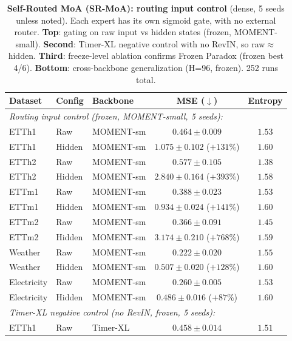 \documentclass{article}
\begin{document}
\begin{table}[!htbp]
\centering
\caption{\textbf{Self-Routed MoA (SR-MoA): routing input control} (dense, 5 seeds unless noted). Each expert has its own sigmoid gate, with no external router. \textbf{Top}: gating on raw input vs hidden states (frozen, MOMENT-small). \textbf{Second}: Timer-XL negative control with no RevIN, so raw$\approx$hidden. \textbf{Third}: freeze-level ablation confirms Frozen Paradox (frozen best 4/6). \textbf{Bottom}: cross-backbone generalization (H=96, frozen). 252 runs total.}
\label{tab:self_routed}
\footnotesize
\begin{tabular}{@{}lllcc@{}}
\toprule
Dataset & Config & Backbone & MSE ($\downarrow$) & Entropy \\
\midrule
\multicolumn{5}{l}{\textit{Routing input control (frozen, MOMENT-small, 5 seeds):}} \\
ETTh1       & Raw     & MOMENT-sm & $\mathbf{0.464 \pm 0.009}$ & $1.53$ \\
ETTh1       & Hidden  & MOMENT-sm & $1.075 \pm 0.102$ {\scriptsize($+131\%$)} & $1.60$ \\
ETTh2       & Raw     & MOMENT-sm & $\mathbf{0.577 \pm 0.105}$ & $1.38$ \\
ETTh2       & Hidden  & MOMENT-sm & $2.840 \pm 0.164$ {\scriptsize($+393\%$)} & $1.58$ \\
ETTm1       & Raw     & MOMENT-sm & $\mathbf{0.388 \pm 0.023}$ & $1.53$ \\
ETTm1       & Hidden  & MOMENT-sm & $0.934 \pm 0.024$ {\scriptsize($+141\%$)} & $1.60$ \\
ETTm2       & Raw     & MOMENT-sm & $\mathbf{0.366 \pm 0.091}$ & $1.45$ \\
ETTm2       & Hidden  & MOMENT-sm & $3.174 \pm 0.210$ {\scriptsize($+768\%$)} & $1.59$ \\
Weather     & Raw     & MOMENT-sm & $\mathbf{0.222 \pm 0.020}$ & $1.55$ \\
Weather     & Hidden  & MOMENT-sm & $0.507 \pm 0.020$ {\scriptsize($+128\%$)} & $1.60$ \\
Electricity & Raw     & MOMENT-sm & $\mathbf{0.260 \pm 0.005}$ & $1.53$ \\
Electricity & Hidden  & MOMENT-sm & $0.486 \pm 0.016$ {\scriptsize($+87\%$)} & $1.60$ \\
\midrule
\multicolumn{5}{l}{\textit{Timer-XL negative control (no RevIN, frozen, 5 seeds):}} \\
ETTh1       & Raw     & Timer-XL & $\mathbf{0.458 \pm 0.014}$ & $1.51$ \\

\end{tabular}
\end{table}
\end{document}
